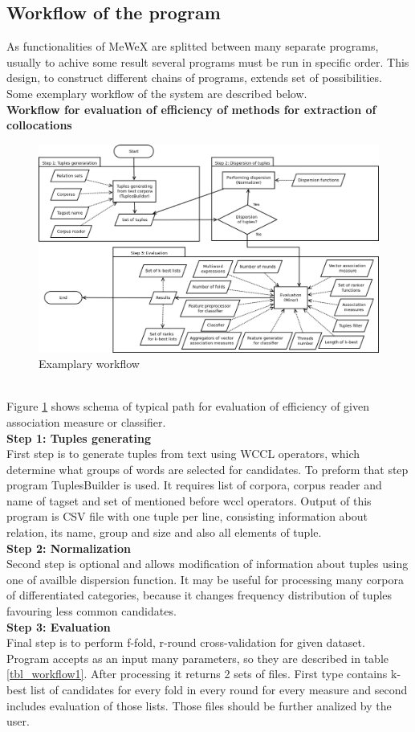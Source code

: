 \subsection{Workflow of the program} \label{mewex_workflow}
As functionalities of MeWeX are splitted between many separate programs, usually to achive some result several programs must be run in specific order. 
This design, to construct different chains of programs, extends set of possibilities. Some exemplary workflow of the system are described below. 
\\ \textbf{Workflow for evaluation of efficiency of methods for extraction of collocations}
\begin{figure}[ht]
	\centering
	\includegraphics[scale=0.4]{img/mewex_workflow1.png}
	\caption{Examplary workflow}
	\label{img_workflow1}
\end{figure}
\\ Figure \ref{img_workflow1} shows schema of typical path for evaluation of efficiency of given association measure or classifier.
\\ \textbf{Step 1: Tuples generating}\\
First step is to generate tuples from text using WCCL operators, which determine what groups of words are selected for candidates. 
To preform that step program TuplesBuilder is used. It requires list of corpora, corpus reader and name of tagset and 
set of mentioned before wccl operators. Output of this program is CSV file with one tuple per line, consisting information about relation, 
its name, group and size and also all elements of tuple.
\\ \textbf{Step 2: Normalization}\\
Second step is optional and allows modification of information about tuples using one of availble dispersion function. 
It may be useful for processing many corpora of differentiated categories, because it changes frequency distribution of tuples 
favouring less common candidates.
\\ \textbf{Step 3: Evaluation}\\
Final step is to perform f-fold, r-round cross-validation for given dataset. Program accepts as an input many parameters, 
so they are described in table \ref{tbl_workflow1}. After processing it returns 2 sets of files. First type contains k-best list 
of candidates for every fold in every round for every measure and second includes evaluation of those lists. 
Those files should be further analized by the user. 


